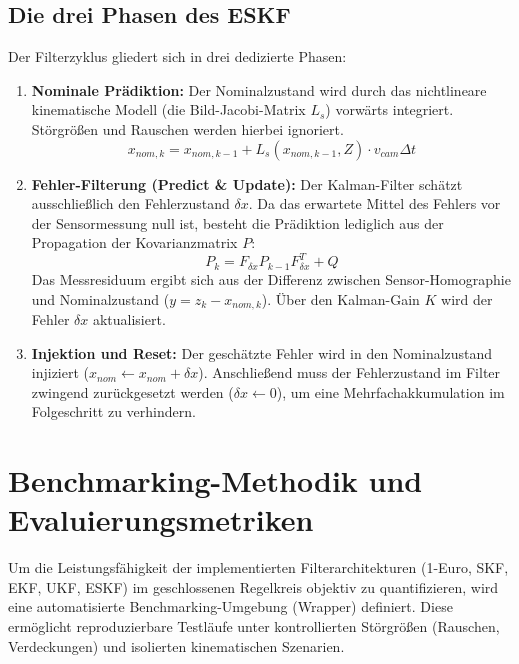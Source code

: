\documentclass{article}
\begin{document}
\subsection{Die drei Phasen des ESKF}
Der Filterzyklus gliedert sich in drei dedizierte Phasen:
\begin{enumerate}
    \item \textbf{Nominale Prädiktion:} Der Nominalzustand wird durch das nichtlineare kinematische Modell (die Bild-Jacobi-Matrix $L_s$) vorwärts integriert. Störgrößen und Rauschen werden hierbei ignoriert.
    \begin{equation}
        x_{nom, k} = x_{nom, k-1} + L_s(x_{nom, k-1}, Z) \cdot v_{cam} \Delta t
    \end{equation}
    \item \textbf{Fehler-Filterung (Predict \& Update):} Der Kalman-Filter schätzt ausschließlich den Fehlerzustand $\delta x$. Da das erwartete Mittel des Fehlers vor der Sensormessung null ist, besteht die Prädiktion lediglich aus der Propagation der Kovarianzmatrix $P$:
    \begin{equation}
        P_k = F_{\delta x} P_{k-1} F_{\delta x}^T + Q
    \end{equation}
    Das Messresiduum ergibt sich aus der Differenz zwischen Sensor-Homographie und Nominalzustand ($y = z_k - x_{nom, k}$). Über den Kalman-Gain $K$ wird der Fehler $\delta x$ aktualisiert.
    \item \textbf{Injektion und Reset:} Der geschätzte Fehler wird in den Nominalzustand injiziert ($x_{nom} \leftarrow x_{nom} + \delta x$). Anschließend muss der Fehlerzustand im Filter zwingend zurückgesetzt werden ($\delta x \leftarrow 0$), um eine Mehrfachakkumulation im Folgeschritt zu verhindern.
\end{enumerate}





\section{Benchmarking-Methodik und Evaluierungsmetriken}
\label{sec:benchmarking}

Um die Leistungsfähigkeit der implementierten Filterarchitekturen (1-Euro, SKF, EKF, UKF, ESKF) im geschlossenen Regelkreis objektiv zu quantifizieren, wird eine automatisierte Benchmarking-Umgebung (Wrapper) definiert. Diese ermöglicht reproduzierbare Testläufe unter kontrollierten Störgrößen (Rauschen, Verdeckungen) und isolierten kinematischen Szenarien.
\end{document}
